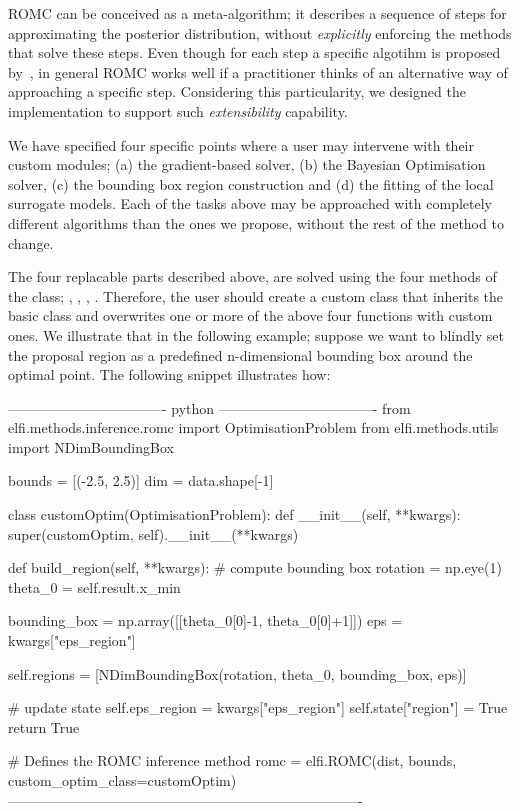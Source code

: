 ROMC can be conceived as a meta-algorithm; it describes a sequence of
steps for approximating the posterior distribution, without
\emph{explicitly} enforcing the methods that solve these steps. Even
though for each step a specific algotihm is proposed
by~\cite{Ikonomov2019}, in general ROMC works well if a practitioner
thinks of an alternative way of approaching a specific
step. Considering this particularity, we designed the implementation
to support such \emph{extensibility} capability.

We have specified four specific points where a user may intervene with
their custom modules; (a) the gradient-based solver, (b) the Bayesian
Optimisation solver, (c) the bounding box region construction and (d)
the fitting of the local surrogate models. Each of the tasks above may
be approached with completely different algorithms than the ones we
propose, without the rest of the method to change.

The four replacable parts described above, are solved using the four
methods of the \linebreak {} class;
, ,
\linebreak {},
. Therefore, the user should
create a custom class that inherits the basic
 class and overwrites one or more of the
above four functions with custom ones. We illustrate that in the
following example; suppose we want to blindly set the proposal region
as a predefined n-dimensional bounding box around the optimal
point. The following snippet illustrates how:

\begin{Code}
---------------------------------- python ----------------------------------
from elfi.methods.inference.romc import OptimisationProblem
from elfi.methods.utils import NDimBoundingBox

bounds = [(-2.5, 2.5)]
dim = data.shape[-1]

class customOptim(OptimisationProblem):
    def __init__(self, **kwargs):
        super(customOptim, self).__init__(**kwargs)
        
    def build_region(self, **kwargs):
        # compute bounding box
        rotation = np.eye(1)
        theta_0 = self.result.x_min
        
        bounding_box = np.array([[theta_0[0]-1, theta_0[0]+1]])
        eps = kwargs["eps_region"]
        
        self.regions = [NDimBoundingBox(rotation, theta_0, bounding_box, eps)]
        
        # update state
        self.eps_region = kwargs["eps_region"]
        self.state["region"] = True
        return True

# Defines the ROMC inference method
romc = elfi.ROMC(dist, bounds, custom_optim_class=customOptim)
----------------------------------------------------------------------------    
\end{Code}

